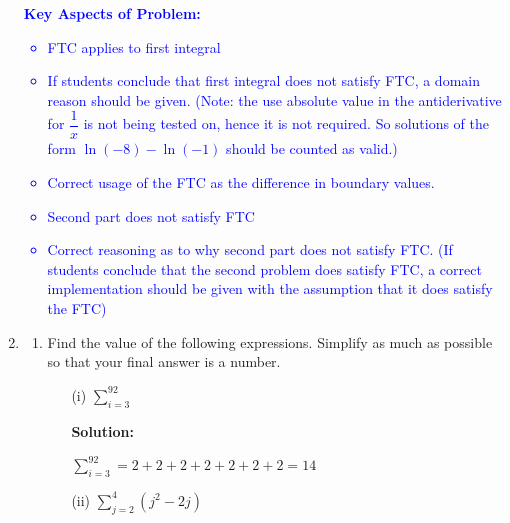 \documentclass[11pt]{article}
\begin{document}
\begin{enumerate}
\textcolor{blue}{
\textbf{Key Aspects of Problem:}
\begin{itemize}
    \item FTC applies to first integral\\
    \item If students conclude that first integral does not satisfy FTC, a domain reason should be given. (Note: the use absolute value in the antiderivative for $\dfrac{1}{x}$ is not being tested on, hence it is not required. So solutions of the form $\ln(-8) - \ln(-1)$ should be counted as valid.)\\
    \item Correct usage of the FTC as the difference in boundary values.\\
    \item Second part does not satisfy FTC\\
    \item Correct reasoning as to why second part does not satisfy FTC. (If students conclude that the second problem does satisfy FTC, a correct implementation should be given with the assumption that it does satisfy the FTC)
\end{itemize}
}

%
%

\item 

\begin{enumerate}
    \item Find the value of the following expressions. Simplify as much as possible so that your final answer is a number.

    \begin{enumerate}
        \item[(i)] $\displaystyle\sum_{i=3}^92$

        {\color{blue}\textbf{Solution:}

        $\displaystyle\sum_{i=3}^92=2+2+2+2+2+2+2=14$
    
        }

        \vfill

        \item[(ii)] $\displaystyle\sum_{j=2}^4(j^2-2j)$


\end{enumerate}
\end{enumerate}
\end{enumerate}
\end{document}
